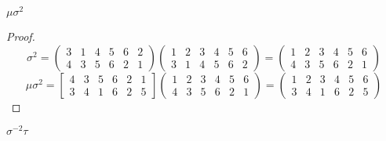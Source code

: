 \newpage
\begin{exercise}
    $\mu{\sigma}^{2}$
\end{exercise}

\begin{proof}
    \[
        {\sigma}^{2} =
        \begin{pmatrix}
            3 & 1 & 4 & 5 & 6 & 2 \\
            4 & 3 & 5 & 6 & 2 & 1
        \end{pmatrix}
        \begin{pmatrix}
            1 & 2 & 3 & 4 & 5 & 6 \\
            3 & 1 & 4 & 5 & 6 & 2
        \end{pmatrix} =
        \begin{pmatrix}
            1 & 2 & 3 & 4 & 5 & 6 \\
            4 & 3 & 5 & 6 & 2 & 1
        \end{pmatrix}
    \]
    \[
        \mu{\sigma}^{2} =
        \begin{bmatrix}
            4 & 3 & 5 & 6 & 2 & 1 \\
            3 & 4 & 1 & 6 & 2 & 5
        \end{bmatrix}
        \begin{pmatrix}
            1 & 2 & 3 & 4 & 5 & 6 \\
            4 & 3 & 5 & 6 & 2 & 1
        \end{pmatrix} =
        \begin{pmatrix}
            1 & 2 & 3 & 4 & 5 & 6 \\
            3 & 4 & 1 & 6 & 2 & 5
        \end{pmatrix}
    \]
\end{proof}

\newpage
\begin{exercise}
    ${\sigma}^{-2}\tau$
\end{exercise}

